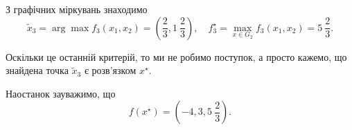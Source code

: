 \begin{solution}
    З графічних міркувань знаходимо \[ \tilde x_3 = \arg \max f_3(x_1, x_2) = \left(\frac23, 1\ \frac23\right), \quad f_3^\star = \max_{x \in G_2} f_3(x_1, x_2) = 5\ \frac23. \]
    
    Оскільки це останній критерій, то ми не робимо поступок, а просто кажемо, що знайдена точка $\tilde x_3$ є розв'язком $x^\star$. \medskip
    
    Наостанок зауважимо, що \[ f(x^\star) = \left(-4, 3, 5\ \frac23\right).\]
\end{solution}

